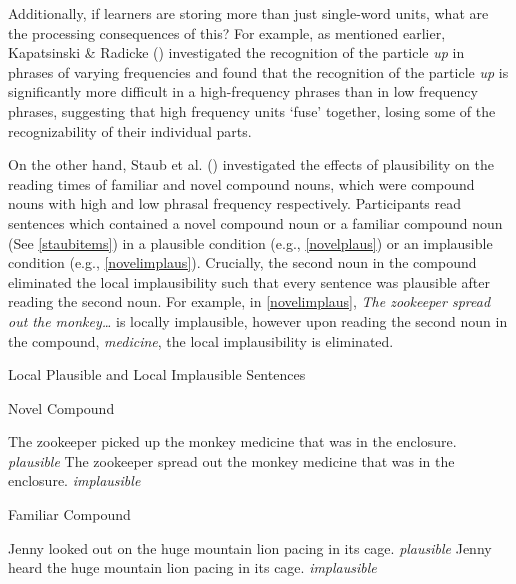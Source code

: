 \documentclass[
  12pt,
  letterpaper,
]{scrreprt}
\begin{document}
Additionally, if learners are storing more than just single-word units,
what are the processing consequences of this? For example, as mentioned
earlier, Kapatsinski \& Radicke
()
investigated the recognition of the particle \emph{up} in phrases of
varying frequencies and found that the recognition of the particle
\emph{up} is significantly more difficult in a high-frequency phrases
than in low frequency phrases, suggesting that high frequency units
`fuse' together, losing some of the recognizability of their individual
parts.

On the other hand, Staub et al.
() investigated the
effects of plausibility on the reading times of familiar and novel
compound nouns, which were compound nouns with high and low phrasal
frequency respectively. Participants read sentences which contained a
novel compound noun or a familiar compound noun (See \ref{staubitems})
in a plausible condition (e.g., \ref{novelplaus}) or an implausible
condition (e.g., \ref{novelimplaus}). Crucially, the second noun in the
compound eliminated the local implausibility such that every sentence
was plausible after reading the second noun. For example, in
\ref{novelimplaus}, \emph{The zookeeper spread out the monkey\ldots{}}
is locally implausible, however upon reading the second noun in the
compound, \emph{medicine}, the local implausibility is eliminated.

\begin{exe}
\ex Local Plausible and Local Implausible Sentences \label{staubitems}
\begin{xlist}
\ex Novel Compound \label{compound}
\begin{xlist}
\ex The zookeeper picked up the monkey medicine that was in the enclosure. \hfill \emph{plausible} \label{novelplaus}
\ex The zookeeper spread out the monkey medicine that was in the enclosure. \hfill \emph{implausible}\label{novelimplaus}
\end{xlist}
\ex Familiar Compound
\begin{xlist}
\ex Jenny looked out on the huge mountain lion pacing in its cage. \hfill \emph{plausible}\label{familiarplaus}
\ex Jenny heard the huge mountain lion pacing in its cage. \hfill \emph{implausible} \label{familiarimplaus}
\end{xlist}
\end{xlist}
\end{exe}
\end{document}
